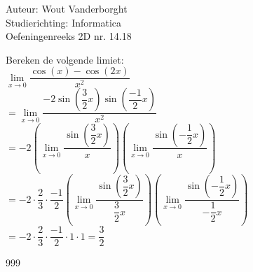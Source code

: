 \documentclass[a4paper]{article}
\newcommand{\Limit}{\lim\limits_}
\begin{document}
  
\noindent \large Auteur: Wout Vanderborght\\
\noindent \large Studierichting: Informatica\\
\noindent \large Oefeningenreeks 2D nr. 14.18\\

\medskip

\normalsize

Bereken de volgende limiet: \\

$ \Limit{x \rightarrow 0} \dfrac{\cos(x) - \cos(2x)}{x^2} $ \\

$ = \Limit{x \rightarrow 0} \dfrac{-2 \sin\left(\dfrac{3}{2}x\right) \sin\left(\dfrac{-1}{2}x\right)}{x^2} $ \\

$ = -2 \left(\Limit{x \rightarrow 0} \dfrac{\sin\left(\dfrac{3}{2}x\right)}{x}\right) \left(\Limit{x \rightarrow 0} \dfrac{\sin\left(-\dfrac{1}{2}x\right)}{x}\right) $ \\

$ = -2 \cdot \dfrac{2}{3} \cdot \dfrac{-1}{2} \left(\Limit{x \rightarrow 0} \dfrac{\sin\left(\dfrac{3}{2}x\right)}{\dfrac{3}{2}x}\right) \left(\Limit{x \rightarrow 0} \dfrac{\sin\left(-\dfrac{1}{2}x\right)}{-\dfrac{1}{2}x}\right) $ \\


$ = -2 \cdot \dfrac{2}{3} \cdot \dfrac{-1}{2} \cdot 1 \cdot 1 = \dfrac{3}{2} $

\begin{thebibliography}{999}
\end{thebibliography}
\end{document}
